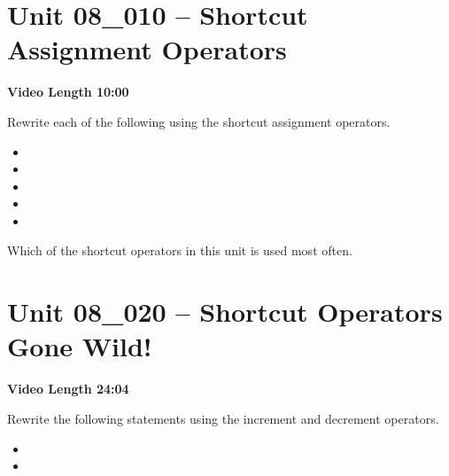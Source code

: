 \documentclass[letterpaper,12pt]{exam}
\newcommand{\unit}{Unit 08}
\begin{document}
\section*{\unit\_010 -- Shortcut Assignment Operators} %
\par{\selectfont\textbf{Video Length 10:00}}

\begin{questions}
\begin{samepage}
    \question Rewrite each of the following using the shortcut assignment operators.
      \begin{itemize}
        \item {}
        \vspace{5mm}
        \item {}
        \vspace{5mm}
        \item {}
        \vspace{5mm}
        \item {}
        \vspace{5mm}
        \item {}
        \vspace{5mm}
       \end{itemize}
\end{samepage}

\begin{samepage}
    \question Which of the shortcut operators in this unit is used most often.
    \vspace{5mm}
\end{samepage}


\section*{\unit\_020 -- Shortcut Operators Gone Wild!} %
\par{\selectfont\textbf{Video Length 24:04}}

\begin{samepage}
    \question Rewrite the following statements using the increment and decrement operators.
      \begin{itemize}
        \item {}
        \vspace{5mm}
        \item {}
        \vspace{5mm}
       \end{itemize}
\end{samepage}


\end{questions}
\end{document}
